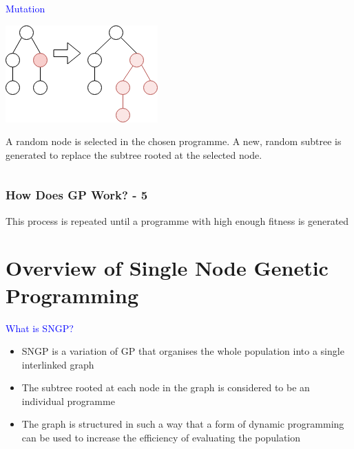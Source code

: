 \documentclass{beamer}
\newcommand{\blue}[1]{\textcolor{blue}{#1}}
\begin{document}
\begin{frame}
\begin{columns}[T]
\begin{column}{0.3\textwidth}
					\blue{Mutation}
					
					\medskip
					
					\includegraphics[scale=0.35]{resources/7_mutation}
					
					\begin{small}
						A random node is selected in the chosen programme. A new, random subtree is generated to replace the subtree rooted at the selected node.
					\end{small}
				\end{column}
				
			\end{columns}
			
		\end{frame}
	
		\begin{frame}
		
			\frametitle{How Does GP Work? - 5}
			
			This process is repeated until a programme with high enough fitness is generated
		
		\end{frame}
	
	
	\section{Overview of Single Node Genetic Programming}

		\begin{frame}
			
			\large{\blue{What is SNGP?}}
			
			\medskip
			
			\pause
			
			\begin{itemize}
				\item SNGP is a variation of GP that organises the whole population into a single interlinked graph
				
				\pause
				
				\item The subtree rooted at each node in the graph is considered to be an individual programme
				
				\pause
				
				\item The graph is structured in such a way that a form of dynamic programming can be used to increase the efficiency of evaluating the population
			\end{itemize}
			
		\end{frame}
	
\end{document}
